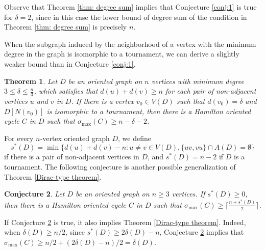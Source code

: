 \documentclass[11pt]{article}
\newtheorem{theorem}{Theorem}[section]
\newtheorem{conjecture}[theorem]{Conjecture}
\newcommand{\QGr}[1]{{#1}}
\newcommand{\QG}[1]{{#1}}
\newcommand{\GGn}[1]{{#1}}
\newcommand{\YLn}[1]{{#1}}
\newcommand{\2}{\vspace{0.2cm}}
\begin{document}
Observe that Theorem \ref{thm: degree sum} implies that Conjecture \ref{conj:1} is true for $\delta=2$, \QGr{since in this case the lower bound of degree sum of the condition in  Theorem \ref{thm: degree sum} is precisely $n$.}

When \YLn{the subgraph induced by} the neighborhood of a vertex with the minimum degree in the graph is isomorphic to a tournament, we can derive a slightly weaker bound than in Conjecture \ref{conj:1}.

\begin{theorem}\label{clique-N(v)}
    Let $D$ be an oriented graph on $n$ vertices with minimum degree $3 \le \delta \le \frac{n}{3}$, which satisfies \QGr{that $d(u)+d(v)\ge n$ for each pair of non-adjacent vertices $u$ and $v$ in $D$}. If there is a vertex $v_0 \in V(D)$ such that $d(v_0)=\delta$ and $D[N(v_0)]$ is isomorphic to a tournament, then there is a Hamilton oriented cycle $C$ in $D$ such that \QG{$\sigma_{\max}(C) \ge n-\delta-2$}.
\end{theorem}





For every $n$-vertex oriented graph $D$, we define $$s^*(D)=\min\{d(u)+d(v)-n: u\ne v\in V(D), \{uv,vu\} \cap A(D)=\emptyset\}$$
if there is a pair of non-adjacent vertices in $D$, and $s^*(D)=n-2$ if $D$ is a tournament. The following conjecture is another possible generalization of Theorem \ref{Dirac-type theorem}. %

	\begin{conjecture}\label{conj:2}
		Let $D$ be an oriented graph on \GGn{$n\ge 3$} vertices. If $s^*(D)\geq 0$, then there is a Hamilton oriented cycle $C$ in $D$ such that $\sigma_{\max}(C)\geq \lceil\frac{n+s^*(D)}{2}\rceil$.
	\end{conjecture}
	

	If Conjecture \ref{conj:2} is true, it also implies Theorem \ref{Dirac-type theorem}. Indeed, when $\delta(D) \ge n/2$, since $s^*(D)\geq 2\delta(D)-n$, Conjecture \ref{conj:2} implies that $\sigma_{\max}(C)\geq n/2 + (2\delta(D)-n)/2=\delta(D)$. 
\end{document}
